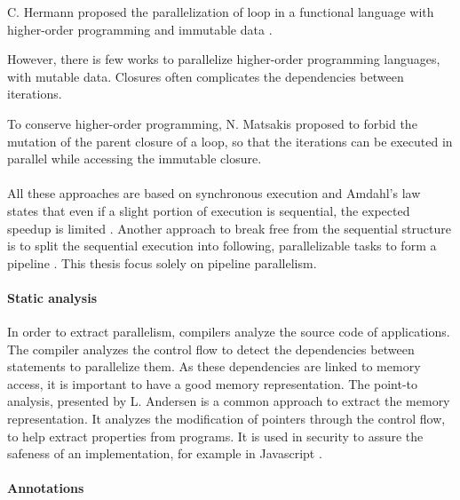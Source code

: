 C. Hermann proposed the parallelization of loop in a functional language with higher-order programming and immutable data \cite{Herrmann2000}.

However, there is few works to parallelize higher-order programming languages, with mutable data.
\nt{}
Closures often complicates the dependencies between iterations.

To conserve higher-order programming, N. Matsakis proposed to forbid the mutation of the parent closure of a loop, so that the iterations can be executed in parallel while accessing the immutable closure\cite{Matsakis2012a}.

\paragraph{}

All these approaches are based on synchronous execution and Amdahl's law states that even if a slight portion of execution is sequential, the expected speedup is limited \cite{Amdahl1967,Clements2013a}.
Another approach to break free from the sequential structure is to split the sequential execution into following, parallelizable tasks to form a pipeline \cite{Kamruzzaman2013,Fernandez2014a}.
This thesis focus solely on pipeline parallelism.

\paragraph{Static analysis}

In order to extract parallelism, compilers analyze the source code of applications.
The compiler analyzes the control flow to detect the dependencies between statements to parallelize them.
As these dependencies are linked to memory access, it is important to have a good memory representation.
The point-to analysis, presented by L. Andersen \cite{Andersen1994} is a common approach to extract the memory representation.
It analyzes the modification of pointers through the control flow, to help extract properties from programs.
It is used in security to assure the safeness of an implementation, for example in Javascript \cite{Chudnov2015}.

\paragraph{Annotations}

